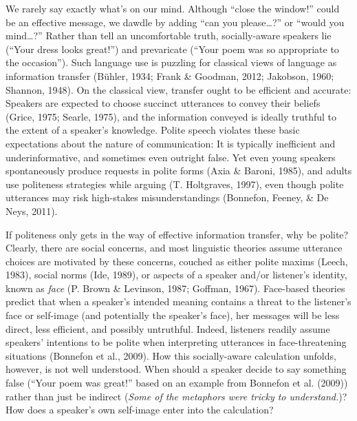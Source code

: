 \documentclass[oneside]{report}
\begin{document}
We rarely say exactly what's on our mind. Although ``close the window!''
could be an effective message, we dawdle by adding ``can you
please\ldots{}?'' or ``would you mind\ldots{}?'' Rather than tell an
uncomfortable truth, socially-aware speakers lie (``Your dress looks
great!'') and prevaricate (``Your poem was so appropriate to the
occasion''). Such language use is puzzling for classical views of
language as information transfer (Bühler, 1934; Frank \& Goodman, 2012;
Jakobson, 1960; Shannon, 1948). On the classical view, transfer ought to
be efficient and accurate: Speakers are expected to choose succinct
utterances to convey their beliefs (Grice, 1975; Searle, 1975), and the
information conveyed is ideally truthful to the extent of a speaker's
knowledge. Polite speech violates these basic expectations about the
nature of communication: It is typically inefficient and
underinformative, and sometimes even outright false. Yet even young
speakers spontaneously produce requests in polite forms (Axia \& Baroni,
1985), and adults use politeness strategies while arguing (T.
Holtgraves, 1997), even though polite utterances may risk high-stakes
misunderstandings (Bonnefon, Feeney, \& De Neys, 2011).

If politeness only gets in the way of effective information transfer,
why be polite? Clearly, there are social concerns, and most linguistic
theories assume utterance choices are motivated by these concerns,
couched as either polite maxims (Leech, 1983), social norms (Ide, 1989),
or aspects of a speaker and/or listener's identity, known as \emph{face}
(P. Brown \& Levinson, 1987; Goffman, 1967). Face-based theories predict
that when a speaker's intended meaning contains a threat to the
listener's face or self-image (and potentially the speaker's face), her
messages will be less direct, less efficient, and possibly untruthful.
Indeed, listeners readily assume speakers' intentions to be polite when
interpreting utterances in face-threatening situations (Bonnefon et al.,
2009). How this socially-aware calculation unfolds, however, is not well
understood. When should a speaker decide to say something false (``Your
poem was great!'' based on an example from Bonnefon et al. (2009))
rather than just be indirect
(\emph{Some of the metaphors were tricky to understand.})? How does a
speaker's own self-image enter into the calculation?
\end{document}
